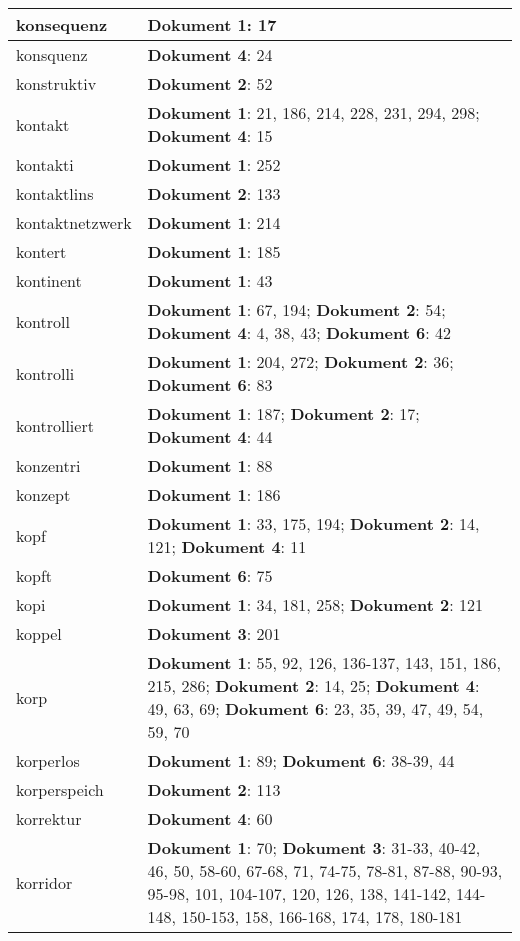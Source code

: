\documentclass[a5paper]{article}
\begin{document}
\begin{longtable}[l]{|l|p{3in}|}
\hline
konsequenz & \textbf{Dokument 1}: 17 \\
\hline
konsquenz & \textbf{Dokument 4}: 24 \\
\hline
konstruktiv & \textbf{Dokument 2}: 52 \\
\hline
kontakt & \textbf{Dokument 1}: 21, 186, 214, 228, 231, 294, 298; \textbf{Dokument 4}: 15 \\
\hline
kontakti & \textbf{Dokument 1}: 252 \\
\hline
kontaktlins & \textbf{Dokument 2}: 133 \\
\hline
kontaktnetzwerk & \textbf{Dokument 1}: 214 \\
\hline
kontert & \textbf{Dokument 1}: 185 \\
\hline
kontinent & \textbf{Dokument 1}: 43 \\
\hline
kontroll & \textbf{Dokument 1}: 67, 194; \textbf{Dokument 2}: 54; \textbf{Dokument 4}: 4, 38, 43; \textbf{Dokument 6}: 42 \\
\hline
kontrolli & \textbf{Dokument 1}: 204, 272; \textbf{Dokument 2}: 36; \textbf{Dokument 6}: 83 \\
\hline
kontrolliert & \textbf{Dokument 1}: 187; \textbf{Dokument 2}: 17; \textbf{Dokument 4}: 44 \\
\hline
konzentri & \textbf{Dokument 1}: 88 \\
\hline
konzept & \textbf{Dokument 1}: 186 \\
\hline
kopf & \textbf{Dokument 1}: 33, 175, 194; \textbf{Dokument 2}: 14, 121; \textbf{Dokument 4}: 11 \\
\hline
kopft & \textbf{Dokument 6}: 75 \\
\hline
kopi & \textbf{Dokument 1}: 34, 181, 258; \textbf{Dokument 2}: 121 \\
\hline
koppel & \textbf{Dokument 3}: 201 \\
\hline
korp & \textbf{Dokument 1}: 55, 92, 126, 136-137, 143, 151, 186, 215, 286; \textbf{Dokument 2}: 14, 25; \textbf{Dokument 4}: 49, 63, 69; \textbf{Dokument 6}: 23, 35, 39, 47, 49, 54, 59, 70 \\
\hline
korperlos & \textbf{Dokument 1}: 89; \textbf{Dokument 6}: 38-39, 44 \\
\hline
korperspeich & \textbf{Dokument 2}: 113 \\
\hline
korrektur & \textbf{Dokument 4}: 60 \\
\hline
korridor & \textbf{Dokument 1}: 70; \textbf{Dokument 3}: 31-33, 40-42, 46, 50, 58-60, 67-68, 71, 74-75, 78-81, 87-88, 90-93, 95-98, 101, 104-107, 120, 126, 138, 141-142, 144-148, 150-153, 158, 166-168, 174, 178, 180-181 \\

\end{longtable}
\end{document}
